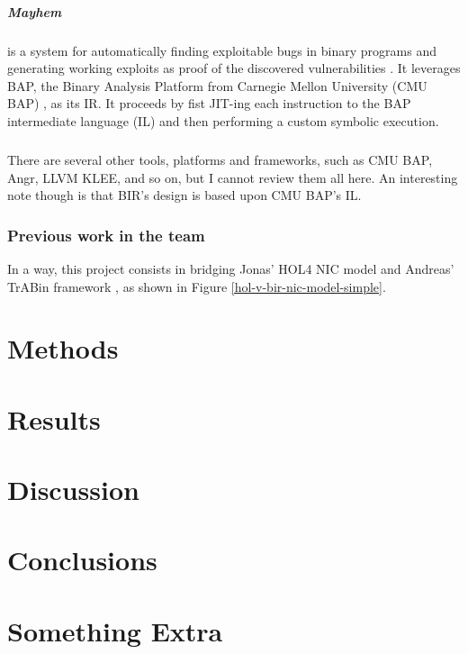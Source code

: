 \documentclass{kththesis}
\begin{document}
\paragraph{Mayhem} is a system for automatically finding exploitable bugs in binary programs and generating working exploits as proof of the discovered vulnerabilities \cite{cha_unleashing_2012}. It leverages BAP, the Binary Analysis Platform from Carnegie Mellon University (CMU BAP) \cite{brumley_bap:_2011}, as its IR. It proceeds by fist JIT-ing each instruction to the BAP intermediate language (IL) and then performing a custom symbolic execution.

\paragraph{} There are several other tools, platforms and frameworks, such as CMU BAP, Angr, LLVM KLEE, and so on, but I cannot review them all here. An interesting note though is that BIR's design is based upon CMU BAP's IL.

\subsection{Previous work in the team}

In a way, this project consists in bridging Jonas' HOL4 NIC model \cite{haglund_formal_2016} and Andreas' TrABin framework \cite{lindner_trabin:_2019}, as shown in Figure \ref{hol-v-bir-nic-model-simple}.

\chapter{Methods}

\chapter{Results}

\chapter{Discussion}

\chapter{Conclusions}

\printbibliography[heading=bibintoc]

\appendix

\chapter{Something Extra}

\tailmatter %
\end{document}
